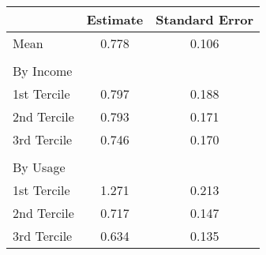 \begin{tabular}{lcc}
& Estimate & Standard Error \\
\hline
Mean &0.778&0.106\\
 & &  \\
By Income & & \\
\hline
1st Tercile &0.797&0.188\\
2nd Tercile &0.793&0.171\\
3rd Tercile &0.746&0.170\\
 & &  \\
By Usage & & \\
\hline
1st Tercile &1.271&0.213\\
2nd Tercile &0.717&0.147\\
3rd Tercile &0.634&0.135\\
\hline
\end{tabular} 
